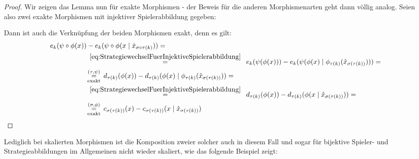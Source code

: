 \begin{proof}
	Wir zeigen das Lemma nun für exakte Morphismen - der Beweis für die anderen Morphismenarten geht dann völlig analog. Seien also zwei exakte Morphismen mit injektiver Spielerabbildung gegeben:
		\begin{center}\end{center}
	Dann ist auch die Verknüpfung der beiden Morphismen exakt, denn es gilt:
		\begin{align*}
			e_k(\psi\circ\phi(x)) &- e_k(\psi\circ\phi(x \mid \hat{x}_{\sigma\circ\tau(k)})) = \\
				&\,\overset{\eqref{eq:StrategiewechselFuerInjektiveSpielerabbildung}}{=}\,\,\,
					e_k(\psi(\phi(x))) - e_k(\psi(\phi(x) \mid \phi_{\tau(k)}(\hat{x}_{\sigma(\tau(k))}))) = \\
				&\!\underset{\text{exakt}}{\overset{(\tau, \psi)}{=}}\,
					d_{\tau(k)}(\phi(x)) - d_{\tau(k)}(\phi(x) \mid \phi_{\tau(k)}(\hat{x}_{\sigma(\tau(k))})) = \\
				&\,\overset{\eqref{eq:StrategiewechselFuerInjektiveSpielerabbildung}}{=}\,\,\, 
					d_{\tau(k)}(\phi(x)) - d_{\tau(k)}(\phi(x \mid \hat{x}_{\sigma(\tau(k))})) = \\
				&\!\underset{\text{exakt}}{\overset{(\sigma, \phi)}{=}}\, 
					c_{\sigma(\tau(k))}(x) - c_{\sigma(\tau(k))}(x \mid \hat{x}_{\sigma(\tau(k))})
				\qedhere
		\end{align*}
\end{proof}

Lediglich bei skalierten Morphismen ist die Komposition zweier solcher auch in diesem Fall und sogar für bijektive Spieler- und Strategieabbildungen im Allgemeinen nicht wieder skaliert, wie das folgende Beispiel zeigt:

